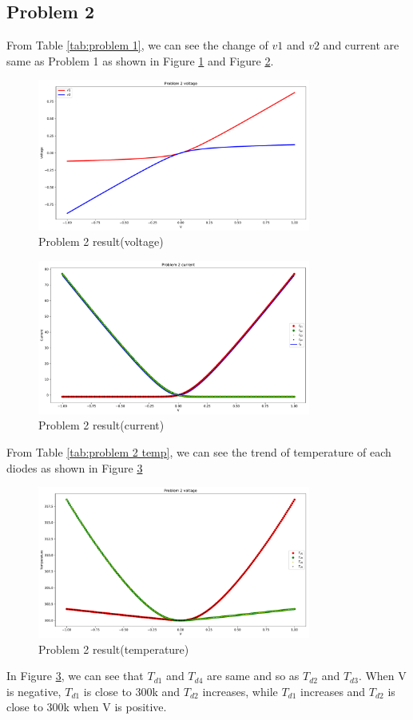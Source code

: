 \documentclass{article}
\begin{document}
\subsection{Problem 2}
\label{sec:p2}
From Table \ref{tab:problem 1}, we can see the change of $v1$ and $v2$ and current are same as Problem 1 as shown in Figure \ref{fig:M2 volt}
and Figure \ref{fig:M2 current}.
\begin{figure}[H]
    \centering
    \includegraphics[width=0.8\textwidth]{src/M2_voltage.pdf}
    \caption{Problem 2 result(voltage)}
    \label{fig:M2 volt}
\end{figure}
\begin{figure}[H]
    \centering
    \includegraphics[width=0.8\textwidth]{src/M2_current.pdf}
    \caption{Problem 2 result(current)}
    \label{fig:M2 current}
\end{figure}
From Table \ref{tab:problem 2 temp}, we can see the trend of temperature of each diodes as shown in Figure \ref{fig:temp}
\begin{figure}[H]
    \centering
    \includegraphics[width=0.8\textwidth]{src/M2_temp.pdf}
    \caption{Problem 2 result(temperature)}
    \label{fig:temp}
\end{figure}
In Figure \ref{fig:temp}, we can see that $T_{d1}$ and $T_{d4}$ are same and so as $T_{d2}$ and $T_{d3}$. 
When V is negative, $T_{d1}$ is close to 300k and $T_{d2}$ increases, while $T_{d1}$ increases and $T_{d2}$ is close to 300k when V is positive.
\end{document}

